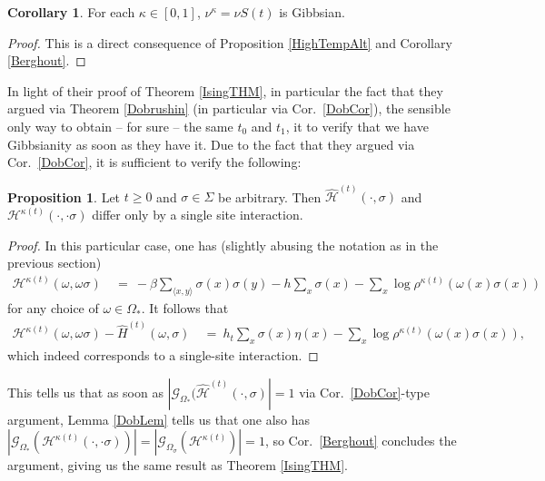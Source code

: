 \documentclass[12pt]{article}
\newcommand{\G}{\mathcal{G}}
\renewcommand{\H}{\mathcal{H}}
\newcommand{\pika}{\boldsymbol{\cdot}}
\newcommand{\1}{\mathbbm{1}}
\renewcommand{\sp}[1]{\langle #1\rangle}
\newcommand{\5}{\vspace{0.5cm}}
\renewcommand{\hat}{\widehat}
\theoremstyle{definition}
\newtheorem{prop}[thm]{Proposition}
\newtheorem{cor}[thm]{Corollary}
\begin{document}
\begin{cor}
For each $\kappa\in[0,1]$, $\nu^\kappa=\nu S(t)$ is Gibbsian.
\end{cor}

\begin{proof}
This is a direct consequence of Proposition \ref{HighTempAlt} and Corollary \ref{Berghout}.
\end{proof}

In light of their proof of Theorem \ref{IsingTHM}, in particular the fact that they argued via Theorem \ref{Dobrushin} (in particular via Cor.~\ref{DobCor}), the sensible only way to obtain -- for sure -- the same $t_0$ and $t_1$, it to verify that we have Gibbsianity as soon as they have it. Due to the fact that they argued via Cor.~\ref{DobCor}, it is sufficient to verify the following:
\begin{prop} Let $t\geq 0$ and $\sigma\in\Sigma$ be arbitrary. Then $\hat{\H}^{(t)}(\pika,\sigma)$ and $\H^{\kappa(t)}(\pika,\pika\sigma)$ differ only by a single site interaction.
\end{prop}
\begin{proof}
In this particular case, one has (slightly abusing the notation as in the previous section)
\begin{align*}
\H^{\kappa(t)}(\omega,\omega\sigma) ~&=~ -\beta\sum_{\sp{x,y}}\sigma(x)\sigma(y) - h\sum_{x}\sigma(x) -\sum_{x}\log\rho^{\kappa(t)}(\omega(x)\sigma(x))
\end{align*}
for any choice of $\omega\in\Omega_*$. It follows that
\begin{align*}
\H^{\kappa(t)}(\omega,\omega\sigma) - \hat{H}^{(t)}(\omega,\sigma) ~&=~ h_t\sum_{x}\sigma(x)\eta(x) - \sum_{x}\log\rho^{\kappa(t)}(\omega(x)\sigma(x)),
\end{align*}
which indeed corresponds to a single-site interaction.
\end{proof}

This tells us that as soon as $|\G_{\Omega_*}(\hat{\H}^{(t)}(\pika,\sigma)|=1$ via Cor.~\ref{DobCor}-type argument, Lemma \ref{DobLem} tells us that one also has $|\G_{\Omega_*}(\H^{\kappa(t)}(\pika,\pika\sigma))|=|\G_{\Omega_\sigma}(\H^{\kappa(t)})|=1$, so Cor.~\ref{Berghout} concludes the argument, giving us the same result as Theorem \ref{IsingTHM}.

\pagebreak

\end{document}
